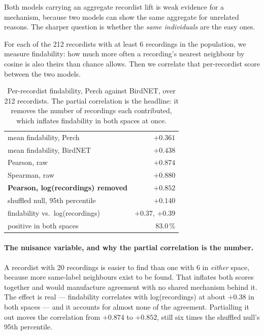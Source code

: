 \documentclass[10pt,twocolumn,a4paper]{article}
\begin{document}
Both models carrying an aggregate recordist lift is weak evidence for a mechanism, because two
models can show the same aggregate for unrelated reasons. The sharper question is whether the
\emph{same individuals} are the easy ones.

For each of the 212 recordists with at least 6 recordings in the population, we measure
findability: how much more often a recording's nearest neighbour by cosine is also theirs than
chance allows. Then we correlate that per-recordist score between the two models.

\begin{table}[t]
\footnotesize
\setlength{\tabcolsep}{5pt}
\caption{Per-recordist findability, Perch against BirdNET, over 212 recordists. The partial
correlation is the headline: it removes the number of recordings each contributed, which inflates
findability in both spaces at once.}
\label{tab:samepeople}
\begin{tabular}{L{4.6cm} r}
\toprule
mean findability, Perch & $+0.361$ \\
mean findability, BirdNET & $+0.438$ \\
\midrule
Pearson, raw & $+0.874$ \\
Spearman, raw & $+0.880$ \\
\textbf{Pearson, log(recordings) removed} & $\mathbf{+0.852}$ \\
\midrule
shuffled null, 95th percentile & $+0.140$ \\
findability vs.\ log(recordings) & $+0.37$, $+0.39$ \\
positive in both spaces & 83.0\,\% \\
\bottomrule
\end{tabular}
\end{table}

\paragraph{The nuisance variable, and why the partial correlation is the number.} A recordist with
20 recordings is easier to find than one with 6 in \emph{either} space, because more same-label
neighbours exist to be found. That inflates both scores together and would manufacture agreement
with no shared mechanism behind it. The effect is real --- findability correlates with
log(recordings) at about $+0.38$ in both spaces --- and it accounts for almost none of the
agreement. Partialling it out moves the correlation from $+0.874$ to $+0.852$, still six times the
shuffled null's 95th percentile.
\end{document}
